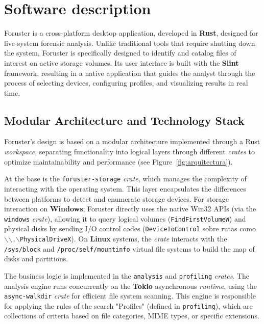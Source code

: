 \documentclass[preprint,12pt, a4paper]{elsarticle}
\begin{document}
\section{Software description}

Foruster is a cross-platform desktop application, developed in \textbf{Rust}, designed for live-system forensic analysis. Unlike traditional tools that require shutting down the system, Foruster is specifically designed to identify and catalog files of interest on active storage volumes. Its user interface is built with the \textbf{Slint} framework, resulting in a native application that guides the analyst through the process of selecting devices, configuring profiles, and visualizing results in real time.

\subsection{Modular Architecture and Technology Stack}

Foruster's design is based on a modular architecture implemented through a Rust \textit{workspace}, separating functionality into logical layers through different \textit{crates} to optimize maintainability and performance (see Figure~\ref{fig:arquitectura}).

At the base is the \texttt{foruster-storage} \textit{crate}, which manages the complexity of interacting with the operating system. This layer encapsulates the differences between platforms to detect and enumerate storage devices. For storage interaction on \textbf{Windows}, Foruster directly uses the native Win32 APIs (via the \texttt{windows} \textit{crate}), allowing it to query logical volumes (\texttt{FindFirstVolumeW}) and physical disks by sending I/O control codes (\texttt{DeviceIoControl} sobre rutas como \texttt{$\backslash$$\backslash$.$\backslash$PhysicalDriveX}). On \textbf{Linux} systems, the \textit{crate} interacts with the \texttt{/sys/block} and \texttt{/proc/self/mountinfo} virtual file systems to build the map of disks and partitions.

The business logic is implemented in the \texttt{analysis} and \texttt{profiling} \textit{crates}. The analysis engine runs concurrently on the \textbf{Tokio} asynchronous \textit{runtime}, using the \texttt{async-walkdir} \textit{crate} for efficient file system scanning. This engine is responsible for applying the rules of the search "Profiles" (defined in \texttt{profiling}), which are collections of criteria based on file categories, MIME types, or specific extensions.
\end{document}
